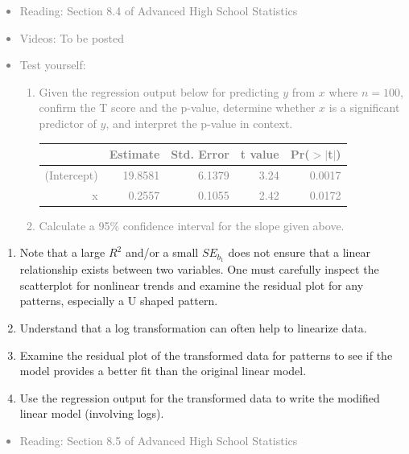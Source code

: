 \documentclass[11pt]{article}
\newcommand{\gray}[1]{\textcolor{gray}{#1}}
\begin{document}
\gray{
{\it
\vspace{-0.55cm}
\begin{itemize}
\renewcommand{\labelitemi}{{\textcolor{dark}{$\ast$}}}
\item Reading: Section 8.4 of Advanced High School Statistics
\item Videos: To be posted 
\item Test yourself: 
\begin{enumerate}
\item Given the regression output below for predicting $y$ from $x$ where $n = 100$, confirm the T score and the p-value, determine whether $x$ is a significant predictor of $y$, and interpret the p-value in context.
\begin{center}
\begin{tabular}{rrrrr}
  \hline
 & Estimate & Std. Error & t value & Pr($>$$|$t$|$) \\ 
  \hline
(Intercept) & 19.8581 & 6.1379 & 3.24 & 0.0017 \\ 
  x & 0.2557 & 0.1055 & 2.42 & 0.0172 \\ 
   \hline
\end{tabular}
\end{center}
\item Calculate a 95\% confidence interval for the slope given above.
\end{enumerate}
\end{itemize}
}}

%

\begin{enumerate}[resume]
\renewcommand\labelenumi{\textcolor{light}{\textbf{LO \theenumi.}}}

\item Note that a large $R^2$ and/or a small $SE_{b_1}$ does not ensure that a linear relationship exists between two variables.  One must carefully inspect the scatterplot for nonlinear trends and examine the residual plot for any patterns, especially a U shaped pattern.

\item Understand that a log transformation can often help to linearize data.

\item Examine the residual plot of the transformed data for patterns to see if the model provides a better fit than the original linear model.  

\item Use the regression output for the transformed data to write the modified linear model (involving logs).

\end{enumerate}

\gray{
{\it
\vspace{-0.55cm}
\begin{itemize}
\renewcommand{\labelitemi}{{\textcolor{dark}{$\ast$}}}
\item Reading: Section 8.5 of Advanced High School Statistics
\end{itemize}
}}
\end{document}
